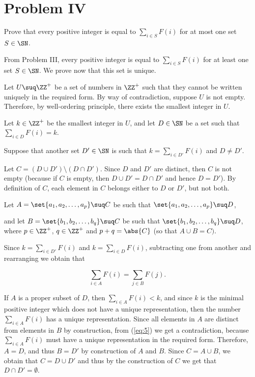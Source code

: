 \documentclass[11pt, letterpaper]{scrartcl}
\begin{document}
\section{Problem IV}

\begin{problem*}
  \hfill
  
Prove that every positive integer is equal to $\sum_{i\in S}F(i)$ for at most one set $S\in\SN$.
\end{problem*}

\begin{soln}
  \hfill

From Problem III, every positive integer is equal to
$\sum_{i\in S}F(i)$ for at least one set $S\in\SN$. We prove now that
this set is unique.

Let $U\suq \ZZ^{+}$ be a set of numbers in $\ZZ^{+}$ such that they
cannot be written uniquely in the required form. By way of
contradiction, suppose $U$ is not empty. Therefore, by well-ordering
principle, there exists the smallest integer in $U$.

Let $k\in\ZZ^{+}$ be the smallest integer in $U$, and let $D\in\SN$ be a set such that
$\sum_{i\in D}F(i) = k$.

Suppose that another set $D'\in\SN$ is such that
$k=\sum_{i\in D'}F(i)$ and $D\neq D'$.

Let $C = (D\cup D')\setminus(D\cap D')$. Since $D$ and $D'$ are distinct, then $C$ is not empty (because if $C$ is empty, then $D\cup D' = D\cap D'$ and hence $D = D'$). By definition of $C$, each element in $C$ belongs either to $D$ or $D'$, but not both.

Let $A = \set{a_1, a_2, \dots, a_p} \suq C$ be such that $\set{a_1, a_2, \dots, a_p} \suq D$,

and let $B=\set{b_1, b_2, \dots, b_q}\suq C$ be such that $\set{b_1, b_2, \dots, b_q}\suq D$, where $p\in\ZZ^{+}$, $q\in\ZZ^+$ and $p+q = \abs{C}$ (so that $A\cup B = C)$.

Since $k=\sum_{i\in D'}F(i)$ and $k=\sum_{i\in D}F(i)$, subtracting one from another and rearranging we obtain that

\begin{equation}
  \label{eq:5}
  \sum_{i\in A} F(i) = \sum_{j\in B} F(j).
\end{equation}

If $A$ is a proper subset of $D$, then $\sum_{i\in A} F(i) < k$, and
since $k$ is the minimal positive integer which does not have a unique
representation, then the number $\sum_{i\in A} F(i)$ has a unique
representation. Since all elements in $A$ are distinct from elements
in $B$ by construction, from (\ref{eq:5}) we get a contradiction,
because $\sum_{i\in A} F(i)$ must have a unique representation in the
required form. Therefore, $A = D$, and thus $B = D'$ by construction
of $A$ and $B$. Since $C = A\cup B$, we obtain that $C = D\cup D'$ and
thus by the construction of $C$ we get that $D\cap D' = \emptyset$.



\end{soln}
\end{document}
